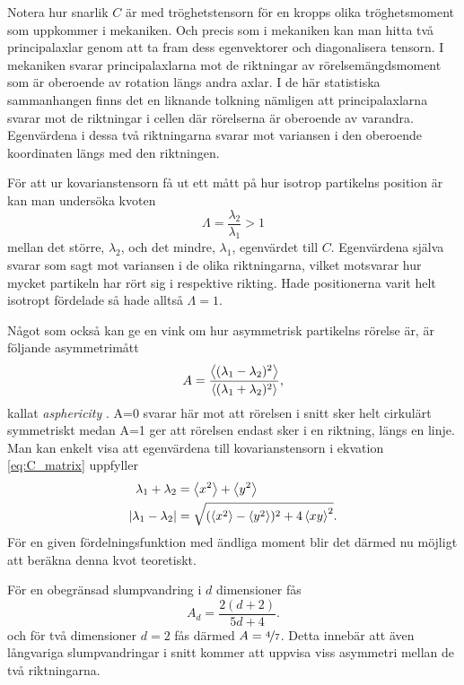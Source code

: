 Notera hur snarlik $C$ är med tröghetstensorn för en kropps olika tröghetsmoment som uppkommer i mekaniken. Och precis som i mekaniken kan man hitta två principalaxlar genom att ta fram dess egenvektorer och diagonalisera tensorn. I mekaniken svarar principalaxlarna mot de riktningar av rörelsemängdsmoment som är oberoende av rotation längs andra axlar. I de här statistiska sammanhangen finns det en liknande tolkning nämligen att principalaxlarna svarar mot de riktningar i cellen där rörelserna är oberoende av varandra. Egenvärdena i dessa två riktningarna svarar mot variansen i den oberoende koordinaten längs med den riktningen.

För att ur kovarianstensorn få ut ett mått på hur isotrop partikelns position är kan man undersöka kvoten
\begin{equation}
\varLambda = \frac{\lambda_2}{\lambda_1} >1
\end{equation} 
mellan det större, $\lambda_2$, och det mindre, $\lambda_1$,  egenvärdet till $C$. Egenvärdena själva svarar som sagt mot variansen i de olika riktningarna, vilket motsvarar hur mycket partikeln har rört sig i respektive rikting. Hade positionerna varit helt isotropt fördelade så hade alltså $\varLambda=1$. 

Något som också kan ge en vink om hur asymmetrisk partikelns rörelse är, är följande asymmetrimått \cite{Hong_asymmetri1998}
\begin{equation}
A=\dfrac{\ev{(\lambda_1 - \lambda_2)^2}}{\ev{(\lambda_1 + \lambda_2)^2}},
\end{equation}
kallat  \emph{asphericity} \cite{Rudnick_Asphericity1986}. A=0 svarar här mot att rörelsen i snitt sker helt cirkulärt symmetriskt medan A=1 ger att rörelsen endast sker i en riktning, längs en linje. Man kan enkelt visa att egenvärdena till kovarianstensorn i ekvation \eqref{eq:C_matrix} uppfyller
\begin{align}
    \lambda_1+\lambda_2 &= \ev{x^2}+\ev{y^2} \\
    \abs{\lambda_1-\lambda_2} &= \sqrt{(\ev{x^2}-\ev{y^2})^2 + 4\ev{xy}^2}.
\end{align} %
För en given fördelningsfunktion med ändliga moment blir det därmed nu möjligt att beräkna denna kvot teoretiskt.

För en obegränsad slumpvandring i $d$ dimensioner fås 
\begin{equation} \label{eq:Asphericity_Brownian}
    A_d=\frac{2(d+2)}{5d+4}.
\end{equation}
och för två dimensioner $d=2$ fås därmed $A=\nicefrac{4}{7}$. Detta innebär att även långvariga slumpvandringar i snitt kommer att uppvisa viss asymmetri mellan de två riktningarna. 

